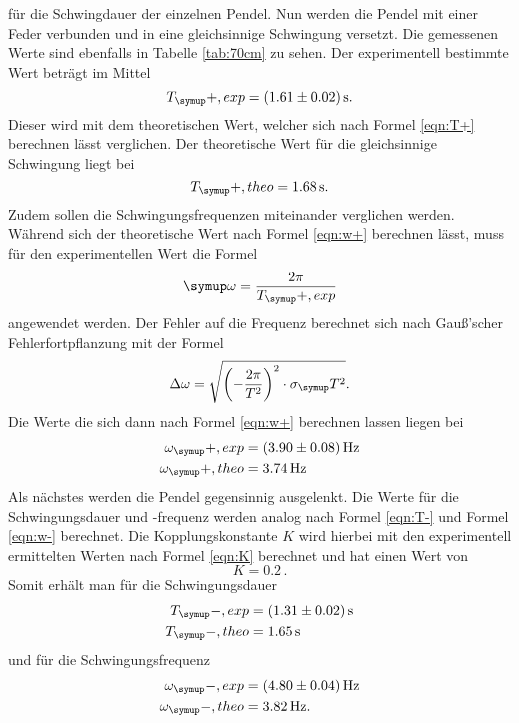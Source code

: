 für die Schwingdauer der einzelnen Pendel. Nun werden die Pendel mit einer Feder
verbunden und in eine gleichsinnige Schwingung versetzt. Die gemessenen Werte
sind ebenfalls in Tabelle \ref{tab:70cm} zu sehen. Der experimentell bestimmte
Wert beträgt im Mittel
\begin{equation*}
  T_\su{+, exp}=(1.61\pm0.02)\sek.
\end{equation*}
Dieser wird mit dem theoretischen Wert, welcher sich nach Formel \eqref{eqn:T+}
berechnen lässt verglichen. Der theoretische Wert für die gleichsinnige Schwingung
liegt bei
\begin{equation*}
  T_\su{+, theo}=1.68\sek.
\end{equation*}
Zudem sollen die Schwingungsfrequenzen miteinander verglichen werden. Während sich
der theoretische Wert nach Formel \eqref{eqn:w+}
berechnen lässt, muss für den experimentellen Wert die Formel
\begin{equation}
  \su{\omega}=\frac{2\pi}{T_\su{+, exp}}
  \label{eqn:wexp}
\end{equation}
angewendet werden.
Der Fehler auf die Frequenz berechnet sich nach
Gauß'scher Fehlerfortpflanzung mit der Formel
\begin{equation}
  \Delta\omega=\sqrt{\biggl(-\frac{2\pi}{T^2}\biggr)^2\cdot\sigma_\su{T}^2}.
\end{equation}
Die Werte die sich dann nach Formel \eqref{eqn:w+} berechnen lassen liegen bei
\begin{align*}
  \omega_\su{+,exp}  &= (3.90 \pm 0.08)\Hz \\
  \omega_\su{+,theo} &= 3.74\Hz
\end{align*}
Als nächstes werden die Pendel gegensinnig ausgelenkt. Die Werte für die
Schwingungsdauer und -frequenz werden analog nach Formel \eqref{eqn:T-}
und Formel \eqref{eqn:w-} berechnet. Die Kopplungskonstante $K$ wird hierbei mit
den experimentell
ermittelten Werten nach Formel \eqref{eqn:K} berechnet und hat einen Wert von
\begin{equation*}
  K = 0.2\,.
\end{equation*}
Somit erhält man für die Schwingungsdauer
\begin{align*}
  T_\su{-, exp} &= (1.31\pm0.02)\sek \\
  T_\su{-, theo} &= 1.65\sek
\end{align*}
und für die Schwingungsfrequenz
\begin{align*}
  \omega_\su{-, exp}  &= (4.80 \pm 0.04)\Hz \\
  \omega_\su{-, theo} &= 3.82\Hz.
\end{align*}
